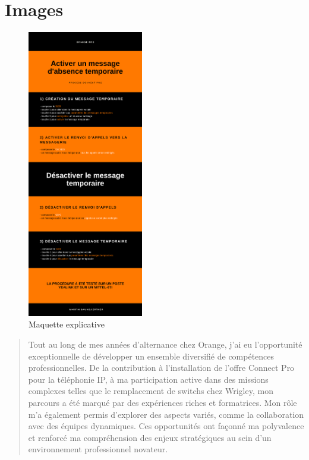\documentclass[12pt, a4paper]{article}
\begin{document}
\section{Images}
\begin{figure}[h]
	\centering
	\includegraphics[width=0.45\textwidth]{img/maquette.png}
	\caption{Maquette explicative}
\end{figure}

\pagestyle{empty}
\newpage
\vspace{10cm}
\begin{quote}
	\centering
	\begin{center}
		Tout au long de mes années d'alternance chez Orange,
		j'ai eu l'opportunité exceptionnelle de développer un
		ensemble diversifié de compétences professionnelles.
		De la contribution à l'installation de l'offre Connect
		Pro pour la téléphonie IP, à ma participation active
		dans des missions complexes telles que le remplacement
		de switchs chez Wrigley, mon parcours a été marqué par
		des expériences riches et formatrices. Mon rôle m'a
		également permis d'explorer des aspects variés,
		comme la collaboration avec des
		équipes dynamiques. Ces opportunités ont façonné
		ma polyvalence et renforcé ma compréhension des
		enjeux stratégiques au sein d'un environnement
		professionnel novateur.
		\end{center}
	
	
\end{quote}
\end{document}
